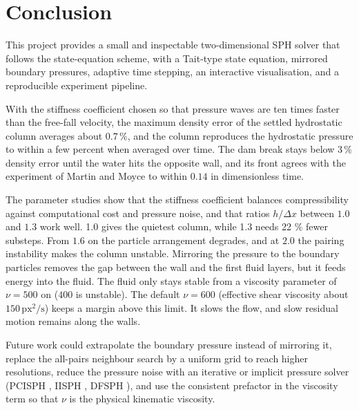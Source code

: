 \newpage
\section{Conclusion}

This project provides a small and inspectable two-dimensional SPH solver that
follows the state-equation scheme, with a Tait-type state
equation, mirrored boundary pressures, adaptive time stepping, an interactive
visualisation, and a reproducible experiment pipeline.

With the stiffness coefficient chosen so that pressure waves are ten times
faster than the free-fall velocity, the maximum density error of the settled
hydrostatic column averages about $0.7\,\%$, and the column reproduces the
hydrostatic pressure to within a few percent when averaged over time. The dam
break stays below $3\,\%$ density error until the water hits the opposite wall,
and its front agrees with the experiment of Martin and Moyce to within $0.14$
in dimensionless time.

The parameter studies show that the stiffness coefficient balances
compressibility against computational cost and pressure noise, and that ratios $h/\Delta x$
between $1.0$ and $1.3$ work well. 1.0 gives the quietest column, while 1.3 needs 22 \% fewer substeps. From $1.6$ on the particle arrangement degrades, and at
$2.0$ the pairing instability makes the column unstable. Mirroring the pressure to the boundary particles removes the
gap between the wall and the first fluid layers, but it feeds energy into the
fluid. The fluid only stays stable from a viscosity parameter of $\nu = 500$ on
($400$ is unstable). The default $\nu = 600$ (effective shear viscosity about
$150\,\mathrm{px^2/s}$) keeps a margin above this limit. It slows the flow, 
and slow residual motion remains along the walls.


Future work could extrapolate the boundary pressure instead of mirroring it,
replace the all-pairs neighbour search by a uniform grid to reach higher
resolutions, reduce the pressure noise with an iterative or implicit pressure
solver (PCISPH \cite{solenthaler2009}, IISPH \cite{ihmsen2014iisph},
DFSPH \cite{bender2015}), and use the consistent prefactor in the viscosity
term so that $\nu$ is the physical kinematic viscosity.
